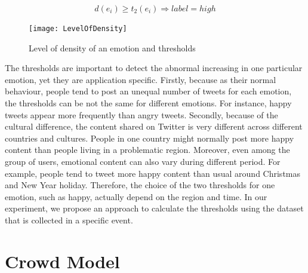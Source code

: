 \begin{equation}
\label{eq:highDensityEmotion}
d(e_i) \geq t_2(e_i) \Rightarrow label = high
\end{equation}

\begin{figure}[htb!] 
\centering    
\texttt{[image: LevelOfDensity]}
\caption{Level of density of an emotion and thresholds}
\label{fig:levelOfDensity}
\end{figure}

The thresholds are important to detect the abnormal increasing in one particular emotion, yet they are application specific. Firstly, because as their normal behaviour, people tend to post an unequal number of tweets for each emotion, the thresholds can be not the same for different emotions. For instance, happy tweets appear more frequently than angry tweets. Secondly, because of the cultural difference, the content shared on Twitter is very different across different countries and cultures. People in one country might normally post more happy content than people living in a problematic region. Moreover, even among the group of users, emotional content can also vary during different period. For example, people tend to tweet more happy content than usual around Christmas and New Year holiday. Therefore, the choice of the two thresholds for one emotion, such as happy, actually depend on the region and time. In our experiment, we propose an approach to calculate the thresholds using the dataset that is collected in a specific event.

\section{Crowd Model}

